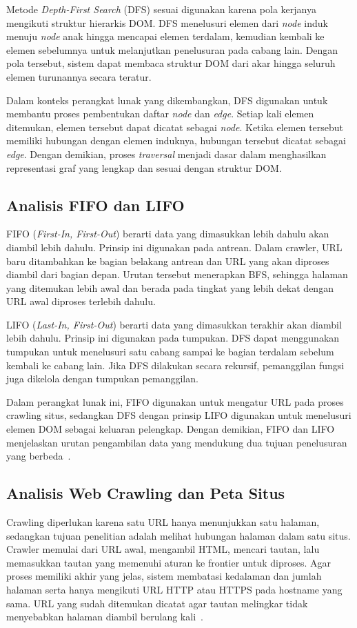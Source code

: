 Metode \textit{Depth-First Search} (DFS) sesuai digunakan karena pola kerjanya mengikuti struktur hierarkis DOM. DFS menelusuri elemen dari \textit{node} induk menuju \textit{node} anak hingga mencapai elemen terdalam, kemudian kembali ke elemen sebelumnya untuk melanjutkan penelusuran pada cabang lain. Dengan pola tersebut, sistem dapat membaca struktur DOM dari akar hingga seluruh elemen turunannya secara teratur.

Dalam konteks perangkat lunak yang dikembangkan, DFS digunakan untuk membantu proses pembentukan daftar \textit{node} dan \textit{edge}. Setiap kali elemen ditemukan, elemen tersebut dapat dicatat sebagai \textit{node}. Ketika elemen tersebut memiliki hubungan dengan elemen induknya, hubungan tersebut dicatat sebagai \textit{edge}. Dengan demikian, proses \textit{traversal} menjadi dasar dalam menghasilkan representasi graf yang lengkap dan sesuai dengan struktur DOM.

\subsection{Analisis FIFO dan LIFO}
FIFO (\textit{First-In, First-Out}) berarti data yang dimasukkan lebih dahulu akan diambil lebih dahulu. Prinsip ini digunakan pada antrean. Dalam crawler, URL baru ditambahkan ke bagian belakang antrean dan URL yang akan diproses diambil dari bagian depan. Urutan tersebut menerapkan BFS, sehingga halaman yang ditemukan lebih awal dan berada pada tingkat yang lebih dekat dengan URL awal diproses terlebih dahulu.

LIFO (\textit{Last-In, First-Out}) berarti data yang dimasukkan terakhir akan diambil lebih dahulu. Prinsip ini digunakan pada tumpukan. DFS dapat menggunakan tumpukan untuk menelusuri satu cabang sampai ke bagian terdalam sebelum kembali ke cabang lain. Jika DFS dilakukan secara rekursif, pemanggilan fungsi juga dikelola dengan tumpukan pemanggilan.

Dalam perangkat lunak ini, FIFO digunakan untuk mengatur URL pada proses crawling situs, sedangkan DFS dengan prinsip LIFO digunakan untuk menelusuri elemen DOM sebagai keluaran pelengkap. Dengan demikian, FIFO dan LIFO menjelaskan urutan pengambilan data yang mendukung dua tujuan penelusuran yang berbeda~\cite{cormen:22:introalgo}.

\subsection{Analisis Web Crawling dan Peta Situs}
Crawling diperlukan karena satu URL hanya menunjukkan satu halaman, sedangkan tujuan penelitian adalah melihat hubungan halaman dalam satu situs. Crawler memulai dari URL awal, mengambil HTML, mencari tautan, lalu memasukkan tautan yang memenuhi aturan ke frontier untuk diproses. Agar proses memiliki akhir yang jelas, sistem membatasi kedalaman dan jumlah halaman serta hanya mengikuti URL HTTP atau HTTPS pada hostname yang sama. URL yang sudah ditemukan dicatat agar tautan melingkar tidak menyebabkan halaman diambil berulang kali~\cite{manning:08:introir}.

